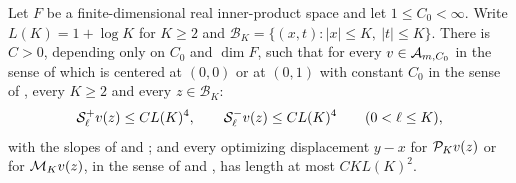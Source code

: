 \begin{lemma}
Let $F$ be a finite-dimensional real inner-product space and let
$1\le C_0<\infty$. Write $L(K)=1+\log K$ for $K\ge2$ and
$\mathcal B_K=\{(x,t):|x|\le K,\ |t|\le K\}$. There is $C>0$, depending only on
$C_0$ and $\dim F$, such that for every $v\in\mathcal{A}_{m,C_0}$ in the sense of
 which is centered at $(0,0)$ or at $(0,1)$ with constant
$C_0$ in the sense of , every $K\ge2$ and every
$z\in\mathcal B_K$:
\begin{equation}\label{eq:envelope-slope-bound}
  \mathcal{S}_\ell^+v(z)\le CL(K)^4,\qquad
  \mathcal{S}_\ell^-v(z)\le CL(K)^4\qquad(0<\ell\le K),
\end{equation}
with the slopes of  and ; and every
optimizing displacement $y-x$ for $\mathcal{P}_Kv(z)$ or for $\mathcal{M}_Kv(z)$, in the
sense of  and , has length at most
$CKL(K)^2$.
\end{lemma}
